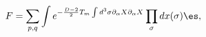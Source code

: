 \begin{equation}
F = \displaystyle \sum_{p, q} \int e^{-\frac{D-2}{2} T_m \int d^3 \sigma 
\partial_\alpha X \partial_\alpha X} \displaystyle \prod_\sigma 
d x(\sigma) \es,
\label{eq:exprnF}
\end{equation}

